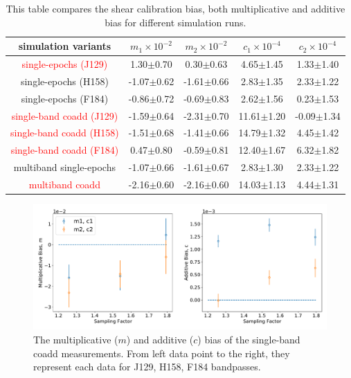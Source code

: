 \documentclass[fleqn,usenatbib]{mnras}
\begin{document}
\begin{table}
	\centering
	\label{tab:bias_summary}
	\begin{tabular}[scale=1.4]{ c|c|c|c|c } 
		\hline
		simulation variants & $m_{1}\times10^{-2}$ & $m_{2}\times10^{-2}$ & $c_{1}\times10^{-4}$ & $c_{2}\times10^{-4}$\\
		\hline
		\textcolor{red}{single-epochs (J129)} & 1.30$\pm$0.70 & 0.30$\pm$0.63 & 4.65$\pm$1.45 & 1.33$\pm$1.40\\
		single-epochs (H158) & -1.07$\pm$0.62 & -1.61$\pm$0.66 & 2.83$\pm$1.35 & 2.33$\pm$1.22\\
		single-epochs (F184) & -0.86$\pm$0.72 & -0.69$\pm$0.83 & 2.62$\pm$1.56 & 0.23$\pm$1.53\\
		\hline
		\textcolor{red}{single-band coadd (J129)} & -1.59$\pm$0.64 & -2.31$\pm$0.70 & 11.61$\pm$1.20 & -0.09$\pm$1.34\\
		\textcolor{red}{single-band coadd (H158)} & -1.51$\pm$0.68 & -1.41$\pm$0.66 & 14.79$\pm$1.32 & 4.45$\pm$1.42\\
		\textcolor{red}{single-band coadd (F184)} & 0.47$\pm$0.80 & -0.59$\pm$0.81 & 12.40$\pm$1.67 & 6.32$\pm$1.82\\
		\hline
		multiband single-epochs & -1.07$\pm$0.66 & -1.61$\pm$0.67 & 2.83$\pm$1.30 & 2.33$\pm$1.22 \\
		\textcolor{red}{multiband coadd} & -2.16$\pm$0.60 & -2.16$\pm$0.60 & 14.03$\pm$1.13 & 4.44$\pm$1.31\\
		
		\hline
	\end{tabular}
	\caption{This table compares the shear calibration bias, both multiplicative and additive bias for different simulation runs.}
	\label{tab:result}
\end{table}

\begin{figure}
	\includegraphics[scale=0.5]{final_result.pdf}
    \caption{The multiplicative ($m$) and additive ($c$) bias of the single-band coadd measurements. From left data point to the right, they represent each data for J129, H158, F184 bandpasses. }
    \label{fig:final_result}
\end{figure}
\end{document}
